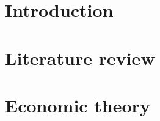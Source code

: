 























%








\maketitle

\thispagestyle{empty}

\clearpage

\pagestyle{scrheadings}

\small {
}
\clearpage
\normalsize

\section{Introduction}


\section{Literature review}


\section{Economic theory}



